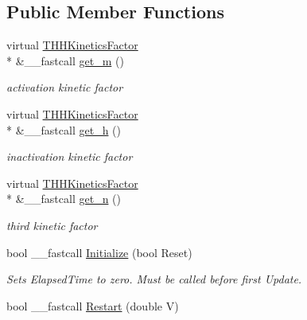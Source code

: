 \subsection*{Public Member Functions}
\begin{DoxyCompactItemize}
\item 
\hypertarget{class_t_h_h_current_adf34934076fdc9dbe0c2287252e6cd2b}{virtual \hyperlink{class_t_h_h_kinetics_factor}{T\+H\+H\+Kinetics\+Factor} \\*
\&\+\_\+\+\_\+fastcall \hyperlink{class_t_h_h_current_adf34934076fdc9dbe0c2287252e6cd2b}{get\+\_\+m} ()}\label{class_t_h_h_current_adf34934076fdc9dbe0c2287252e6cd2b}

\begin{DoxyCompactList}\small\item\em activation kinetic factor \end{DoxyCompactList}\item 
\hypertarget{class_t_h_h_current_a6c6da3155ae563da18380ad889349187}{virtual \hyperlink{class_t_h_h_kinetics_factor}{T\+H\+H\+Kinetics\+Factor} \\*
\&\+\_\+\+\_\+fastcall \hyperlink{class_t_h_h_current_a6c6da3155ae563da18380ad889349187}{get\+\_\+h} ()}\label{class_t_h_h_current_a6c6da3155ae563da18380ad889349187}

\begin{DoxyCompactList}\small\item\em inactivation kinetic factor \end{DoxyCompactList}\item 
\hypertarget{class_t_h_h_current_a122eaf91312c4bc026f22ed3b29d3ff5}{virtual \hyperlink{class_t_h_h_kinetics_factor}{T\+H\+H\+Kinetics\+Factor} \\*
\&\+\_\+\+\_\+fastcall \hyperlink{class_t_h_h_current_a122eaf91312c4bc026f22ed3b29d3ff5}{get\+\_\+n} ()}\label{class_t_h_h_current_a122eaf91312c4bc026f22ed3b29d3ff5}

\begin{DoxyCompactList}\small\item\em third kinetic factor \end{DoxyCompactList}\item 
bool \+\_\+\+\_\+fastcall \hyperlink{class_t_h_h_current_a4a20db9ff660cafb7d7d05399315f530}{Initialize} (bool Reset)
\begin{DoxyCompactList}\small\item\em Sets Elapsed\+Time to zero. Must be called before first Update. \end{DoxyCompactList}\item 
\hypertarget{class_t_h_h_current_ad754d597753a86b26512ccda217a6790}{bool \+\_\+\+\_\+fastcall \hyperlink{class_t_h_h_current_ad754d597753a86b26512ccda217a6790}{Restart} (double V)}\label{class_t_h_h_current_ad754d597753a86b26512ccda217a6790}


\end{DoxyCompactItemize}
